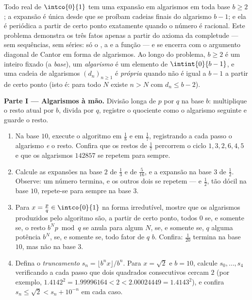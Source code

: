 \begin{problem}
\label{pb:b1:reals:1}
Todo real de $\intco{0}{1}$ tem uma expansão em algarismos em toda base
$b \geq 2$; a expansão é única desde que se proíbam cadeias finais do
algarismo $b - 1$; e ela é periódica a partir de certo ponto exatamente
quando o número é racional. Este problema demonstra os três fatos
apenas a partir do axioma da completude --- sem sequências, sem séries:
só o , a  e a função  ---
e se encerra com o argumento diagonal de Cantor em forma de algarismos.
Ao longo do problema, $b \geq 2$ é um inteiro fixado (a \emph{base}), um
\emph{algarismo} é um elemento de $\intint{0}{b-1}$, e uma cadeia de
algarismos $(d_n)_{n \geq 1}$ é \emph{própria} quando não é
igual a $b - 1$ a partir de certo ponto (isto é: para todo $N$ existe $n >
N$ com $d_n \leq b - 2$).

\medskip
\noindent\textbf{Parte I --- Algarismos à mão.} Divisão longa de $p$
por $q$ na base $b$: multiplique o resto atual por $b$, divida
por $q$, registre o quociente como o algarismo seguinte e guarde o resto.
\begin{enumerate}
  \item Na base $10$, execute o algoritmo em $\frac 18$ e em
        $\frac 17$, registrando a cada passo o algarismo \emph{e}
        o resto. Confira que os restos de $\frac 17$
        percorrem o ciclo $1, 3, 2, 6, 4, 5$ e que os algarismos
        $142857$ se repetem para sempre.
  \item Calcule as expansões na base $2$ de $\frac 13$ e de
        $\frac{5}{16}$, e a expansão na base $3$ de $\frac 12$.
        Observe: um número termina, e os outros dois se repetem ---
        e $\frac 12$, tão dócil na base $10$, repete-se para sempre na
        base $3$.
  \item Para $x = \frac pq \in \intco{0}{1}$ na forma irredutível, mostre
        que os algarismos produzidos pelo algoritmo são, a partir de certo
        ponto, todos $0$ se, e somente se, o resto $b^N p \bmod q$
        se anula para algum $N$, se, e somente se, $q$  alguma
        potência $b^N$, se, e somente se, todo fator  de $q$
         $b$. Confira: $\frac{1}{20}$ termina na base
        $10$, mas não na base $3$.
  \item Defina o \emph{truncamento} $s_n = \lfloor b^n x \rfloor
        / b^n$. Para $x = \sqrt 2$ e $b = 10$, calcule $s_0,
        \dots, s_4$ verificando a cada passo que dois
        quadrados consecutivos cercam $2$ (por exemplo, $1.4142^2
        = 1.99996164 < 2 < 2.00024449 = 1.4143^2$), e confira
        $s_n \leq \sqrt 2 < s_n + 10^{-n}$ em cada caso.
\end{enumerate}


\end{problem}
